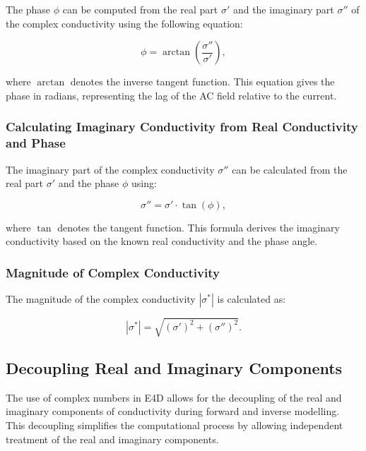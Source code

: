 \documentclass[a4paper,12pt]{article}
\begin{document}
The phase \( \phi \) can be computed from the real part \( \sigma' \) and the imaginary part \( \sigma'' \) of the complex conductivity using the following equation:

\begin{equation}
\phi = \arctan\left(\frac{\sigma''}{\sigma'}\right),
\end{equation}

where \( \arctan \) denotes the inverse tangent function. This equation gives the phase in radians, representing the lag of the AC field relative to the current.

\subsubsection{Calculating Imaginary Conductivity from Real Conductivity and Phase}

The imaginary part of the complex conductivity \( \sigma'' \) can be calculated from the real part \( \sigma' \) and the phase \( \phi \) using:

\begin{equation}
\sigma'' = \sigma' \cdot \tan(\phi),
\end{equation}

where \( \tan \) denotes the tangent function. This formula derives the imaginary conductivity based on the known real conductivity and the phase angle.

\subsubsection{Magnitude of Complex Conductivity}

The magnitude of the complex conductivity \( |\sigma^*| \) is calculated as:

\begin{equation}
|\sigma^*| = \sqrt{(\sigma')^2 + (\sigma'')^2}.
\end{equation}


\subsection{Decoupling Real and Imaginary Components}

The use of complex numbers in E4D allows for the decoupling of the real and imaginary components of conductivity during forward and inverse modelling. This decoupling simplifies the computational process by allowing independent treatment of the real and imaginary components.
\end{document}
